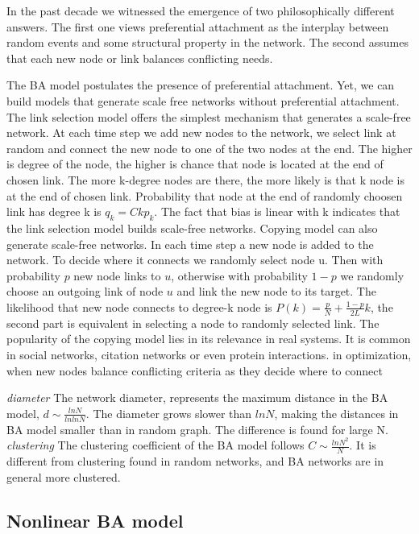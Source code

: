 In the past decade we witnessed the emergence of two philosophically different answers. The first one views preferential attachment as the interplay between random events and some structural property in the network. The second assumes that each new node or link balances conflicting needs. 

The BA model postulates the presence of preferential attachment. Yet, we can build models that generate scale free networks without preferential attachment. The link selection model offers the simplest mechanism that generates a scale-free network. At each time step we add new nodes to the network, we select link at random and connect the new node to one of the two nodes at the end. The higher is degree of the node, the higher is chance that node is located at the end of chosen link. The more k-degree nodes are there, the more likely is that k node is at the end of chosen link. Probability that node at the end of randomly choosen link has degree k is $q_k = Ckp_k$. The fact that bias is linear with k indicates that the link selection model builds scale-free networks. 
Copying model can also generate scale-free networks. In each time step a new node is added to the network. To decide where it connects we randomly select node u. Then with probability $p$ new node links to $u$, otherwise with probability $1-p$ we randomly choose an outgoing link of node $u$ and link the new node to its target. The likelihood that new node connects to degree-k node is $P(k)=\frac{p}{N} + \frac{1-p}{2L}k$, the second part is equivalent in selecting a node to randomly selected link. The popularity of the copying model lies in its relevance in real systems. It is common in social networks, citation networks or even protein interactions. 
in optimization, when new nodes balance conflicting criteria as they decide where to connect

\textit{diameter}
The network diameter, represents the maximum distance in the BA model, $d \sim \frac{lnN}{lnlnN}$. The diameter grows slower than $lnN$, making the distances in BA model smaller than in random graph. The difference is found for large N. 
\textit{clustering}
The clustering coefficient of the BA model follows $C \sim \frac{ln N^2}{N}$. It is different from clustering found in random networks, and BA networks are in general more clustered. 

\subsection{Nonlinear BA model}

